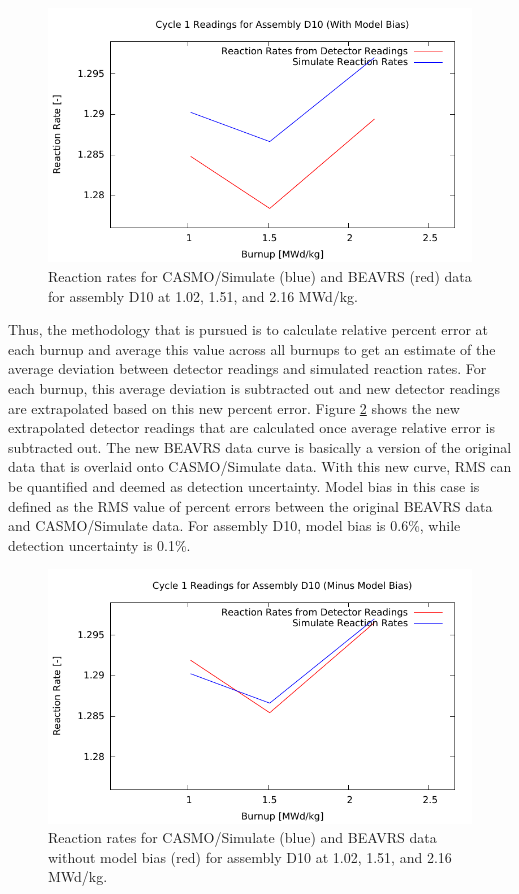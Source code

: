 \documentclass{article}
\begin{document}
\begin{figure}[!htb]
\centering
\includegraphics[keepaspectratio, width = 4.5 in]{figures/D10_before}
\caption{Reaction rates for CASMO/Simulate (blue) and BEAVRS (red) data for assembly D10 at 1.02, 1.51, and 2.16 MWd/kg.}
\label{fig:sim_D10_before}
\end{figure}

Thus, the methodology that is pursued is to calculate relative percent error at each burnup and average this value across all burnups to get an estimate of the average deviation between detector readings and simulated reaction rates. For each burnup, this average deviation is subtracted out and new detector readings are extrapolated based on this new percent error. Figure \ref{fig:sim_D10_after} shows the new extrapolated detector readings that are calculated once average relative error is subtracted out. The new BEAVRS data curve is basically a version of the original data that is overlaid onto CASMO/Simulate data. With this new curve, RMS can be quantified and deemed as detection uncertainty. Model bias in this case is defined as the RMS value of percent errors between the original BEAVRS data and CASMO/Simulate data. For assembly D10, model bias is 0.6\%, while detection uncertainty is 0.1\%.

\begin{figure}[!htb]
\centering
\includegraphics[keepaspectratio, width = 4.5 in]{figures/D10_after}
\caption{Reaction rates for CASMO/Simulate (blue) and BEAVRS data without model bias (red) for assembly D10 at 1.02, 1.51, and 2.16 MWd/kg.}
\label{fig:sim_D10_after}
\end{figure}
\end{document}
